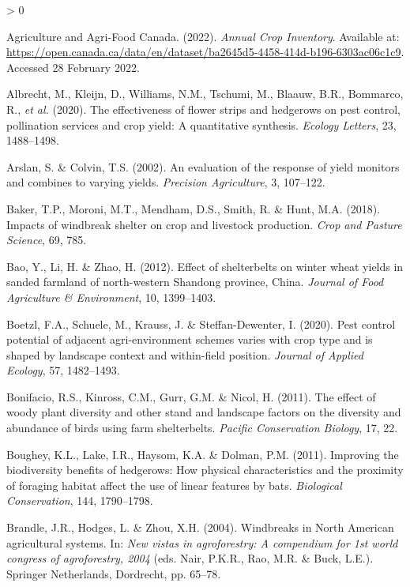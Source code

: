 \documentclass[]{elsarticle} %
\newlength{\cslhangindent}
\newenvironment{CSLReferences}[2] %
 {%
  \setlength{\parindent}{0pt}
  \ifodd #1 \everypar{\setlength{\hangindent}{\cslhangindent}}\ignorespaces\fi
  \ifnum #2 > 0
  \setlength{\parskip}{#2\baselineskip}
  \fi
 }%
 {}
\begin{document}
\hypertarget{refs}{}
\begin{CSLReferences}{1}{0}
\leavevmode\hypertarget{ref-AAFC_data}{}%
Agriculture and Agri-Food Canada. (2022). \emph{{Annual Crop Inventory}}. Available at: \url{https://open.canada.ca/data/en/dataset/ba2645d5-4458-414d-b196-6303ac06c1c9}. Accessed 28 February 2022.

\leavevmode\hypertarget{ref-albrecht2020}{}%
Albrecht, M., Kleijn, D., Williams, N.M., Tschumi, M., Blaauw, B.R., Bommarco, R., \emph{et al.} (2020). The effectiveness of flower strips and hedgerows on pest control, pollination services and crop yield: A quantitative synthesis. \emph{Ecology Letters}, 23, 1488--1498.

\leavevmode\hypertarget{ref-arslan2002}{}%
Arslan, S. \& Colvin, T.S. (2002). An evaluation of the response of yield monitors and combines to varying yields. \emph{Precision Agriculture}, 3, 107--122.

\leavevmode\hypertarget{ref-baker2018}{}%
Baker, T.P., Moroni, M.T., Mendham, D.S., Smith, R. \& Hunt, M.A. (2018). Impacts of windbreak shelter on crop and livestock production. \emph{Crop and Pasture Science}, 69, 785.

\leavevmode\hypertarget{ref-bao2012}{}%
Bao, Y., Li, H. \& Zhao, H. (2012). Effect of shelterbelts on winter wheat yields in sanded farmland of north-western {Shandong} province, {China}. \emph{Journal of Food Agriculture \& Environment}, 10, 1399--1403.

\leavevmode\hypertarget{ref-boetzl2020}{}%
Boetzl, F.A., Schuele, M., Krauss, J. \& Steffan-Dewenter, I. (2020). Pest control potential of adjacent agri-environment schemes varies with crop type and is shaped by landscape context and within-field position. \emph{Journal of Applied Ecology}, 57, 1482--1493.

\leavevmode\hypertarget{ref-bonifacio2011}{}%
Bonifacio, R.S., Kinross, C.M., Gurr, G.M. \& Nicol, H. (2011). The effect of woody plant diversity and other stand and landscape factors on the diversity and abundance of birds using farm shelterbelts. \emph{Pacific Conservation Biology}, 17, 22.

\leavevmode\hypertarget{ref-boughey2011}{}%
Boughey, K.L., Lake, I.R., Haysom, K.A. \& Dolman, P.M. (2011). Improving the biodiversity benefits of hedgerows: How physical characteristics and the proximity of foraging habitat affect the use of linear features by bats. \emph{Biological Conservation}, 144, 1790--1798.

\leavevmode\hypertarget{ref-brandle2004}{}%
Brandle, J.R., Hodges, L. \& Zhou, X.H. (2004). Windbreaks in {North American} agricultural systems. In: \emph{New vistas in agroforestry: A compendium for 1st world congress of agroforestry, 2004} (eds. Nair, P.K.R., Rao, M.R. \& Buck, L.E.). Springer Netherlands, Dordrecht, pp. 65--78.


\end{CSLReferences}
\end{document}
